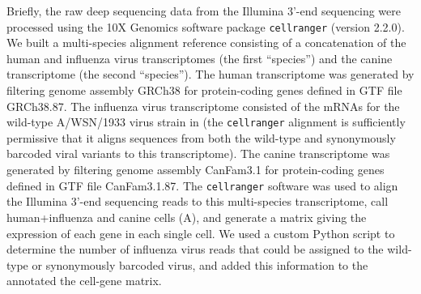 \documentclass[9pt,lineno]{elife}
\begin{document}
Briefly, the raw deep sequencing data from the Illumina 3'-end sequencing were processed using the 10X Genomics software package \texttt{cellranger} (version 2.2.0). 
We built a multi-species alignment reference consisting of a concatenation of the human and influenza virus transcriptomes (the first ``species'') and the canine transcriptome (the second ``species''). 
The human transcriptome was generated by filtering genome assembly GRCh38 for protein-coding genes defined in GTF file GRCh38.87.
The influenza virus transcriptome consisted of the mRNAs for the wild-type A/WSN/1933 virus strain in  (the \texttt{cellranger} alignment is sufficiently permissive that it aligns sequences from both the wild-type and synonymously barcoded viral variants to this transcriptome).
The canine transcriptome was generated by filtering genome assembly CanFam3.1 for protein-coding genes defined in GTF file CanFam3.1.87.
The \texttt{cellranger} software was used to align the Illumina 3'-end sequencing reads to this multi-species transcriptome, call human+influenza and canine cells (A), and generate a matrix giving the expression of each gene in each single cell.
We used a custom Python script to determine the number of influenza virus reads that could be assigned to the wild-type or synonymously barcoded virus, and added this information to the annotated the cell-gene matrix.
\end{document}
